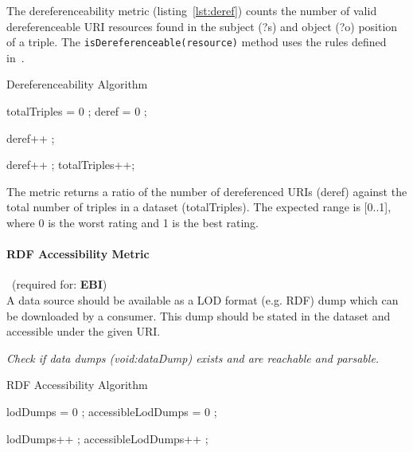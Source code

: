 The dereferenceability metric (listing~\ref{lst:deref}) counts the number of valid dereferenceable URI resources found in the subject (?s) and object (?o) position of a triple. The \texttt{isDereferenceable(resource)} method uses the rules defined in~\cite{Yang2011}.
\begin{algorithm}
\caption{Dereferenceability Algorithm}\label{lst:deref}
\begin{algorithmic}[1]
\State totalTriples = 0 ;
\State deref = 0 ;
\EndProcedure

 deref++ ; \EndIf

 deref++ ; \EndIf
\State totalTriples++;
\EndProcedure
\end{algorithmic}
\end{algorithm}
The metric returns a ratio of the number of dereferenced URIs (deref) against the total number of triples in a dataset (totalTriples). The expected range is [0..1], where 0 is the worst rating and 1 is the best rating.

\paragraph{RDF Accessibility Metric}~(required for: \textbf{EBI})~\\
A data source should be available as a LOD format (e.g. RDF) dump which can be downloaded by a consumer.
This dump should be stated in the dataset and accessible under the given URI.

\begin{mdframed}[style=metricdefinition]
\emph{Check if data dumps (void:dataDump) exists and are reachable and parsable.}
\end{mdframed}

\begin{algorithm}
\caption{RDF Accessibility Algorithm}\label{lst:deref}
\begin{algorithmic}[1]
\State lodDumps = 0 ;
\State accessibleLodDumps = 0 ;
\EndProcedure

 lodDumps++ ; \EndIf
{} accessibleLodDumps++ ; \EndIf
\EndProcedure
\end{algorithmic}
\end{algorithm}

